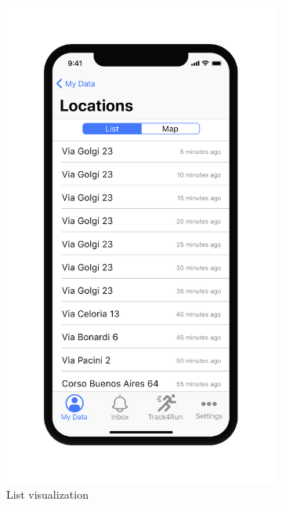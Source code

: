 \begin{figure}
  \begin{subfigure}[b]{0.4\textwidth}
    \includegraphics[scale=0.2,keepaspectratio]{rasdL/Pictures/Mockup/mobile/location1.png}
    \centering
    \captionsetup{labelformat=empty}
    \caption{List visualization}
    \label{fig:1}
  \end{subfigure}
  \begin{subfigure}[b]{0.4\textwidth}

\end{subfigure}
\end{figure}
